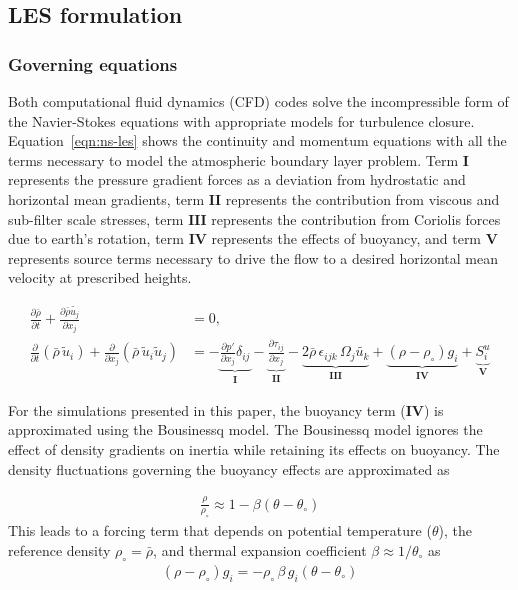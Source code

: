 \subsection{LES formulation}

\subsubsection{Governing equations}
Both computational fluid dynamics (CFD) codes solve the incompressible form of
the Navier-Stokes equations with appropriate models for turbulence
closure. Equation~\ref{eqn:ns-les} shows the continuity and momentum equations
with all the terms necessary to model the atmospheric boundary layer
problem. Term $\mathbf{I}$ represents the pressure gradient forces as a
deviation from hydrostatic and horizontal mean gradients, term $\mathbf{II}$
represents the contribution from viscous and sub-filter scale stresses, term
$\mathbf{III}$ represents the contribution from Coriolis forces due to earth's
rotation, term $\mathbf{IV}$ represents the effects of buoyancy, and term
$\mathbf{V}$ represents source terms necessary to drive the flow to a desired
horizontal mean velocity at prescribed heights.

\begin{align}
  \frac{\partial \bar{\rho}} {\partial t} + \frac{\partial \bar{\rho} \widetilde{u_j}}{\partial x_j} & = 0, \nonumber\\
  \frac{\partial}{\partial t} \left(\bar{\rho}\, \widetilde{u}_i\right) +
  \frac{\partial}{\partial x_j} \left( \bar{\rho}\, \widetilde{u}_i \widetilde{u}_j \right) &=
  - \underbrace{\frac{\partial p'}{\partial x_j} \delta_{ij}}_\mathbf{I}
  - \underbrace{\frac{\partial \tau_{ij}}{\partial x_j}}_\mathbf{II}
  - \underbrace{2\bar{\rho}\,\epsilon_{ijk}\,\Omega_j\widetilde{u_k}}_\mathbf{III}
  + \underbrace{\left(\rho - \rho_\circ \right) g_i}_\mathbf{IV}
  + \underbrace{S^{u}_{i}}_\mathbf{V} \label{eqn:ns-les}
\end{align}

For the simulations presented in this paper, the buoyancy term ($\mathbf{IV}$)
is approximated using the Bousinessq model. The Bousinessq model ignores the
effect of density gradients on inertia while retaining its effects on buoyancy.
The density fluctuations governing the buoyancy effects are approximated as

\begin{align}
  \frac{\rho}{\rho_\circ} \approx 1 - \beta \left( \theta - \theta_\circ \right)
\end{align}
This leads to a forcing term that depends on potential temperature ($\theta$),
the reference density $\rho_\circ = \bar{\rho}$, and thermal expansion
coefficient $\beta \approx 1 / \theta_\circ$ as
\begin{align}
  \left(\rho - \rho_\circ \right) g_i = -\rho_\circ\, \beta\, g_i \left( \theta - \theta_\circ \right)
\end{align}

